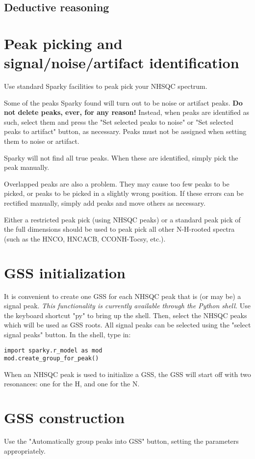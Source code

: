 \documentclass[11pt,a4paper]{article}
\begin{document}
\subsection{Deductive reasoning}


\section{Peak picking and signal/noise/artifact identification}
Use standard Sparky facilities to peak pick your NHSQC spectrum.

Some of the peaks Sparky found will turn out to be noise or artifact peaks.
\textbf{Do not delete peaks, ever, for any reason!}  Instead,
when peaks are identified as such, select them and press the "Set selected 
peaks to noise" or "Set selected peaks to artifact" button, as necessary.
Peaks must not be assigned when setting them to noise or artifact.

Sparky will not find all true peaks.  When these are identified, simply
pick the peak manually.

Overlapped peaks are also a problem.  They may cause too few peaks to be 
picked, or peaks to be picked in a slightly wrong position.  If these errors
can be rectified manually, simply add peaks and move others as necessary.

Either a restricted peak pick (using NHSQC peaks) or a standard peak pick
of the full dimensions should be used to peak pick all other N-H-rooted
spectra (such as the HNCO, HNCACB, CCONH-Tocsy, etc.).


\section{GSS initialization}
It is convenient to create one GSS for each NHSQC peak that is (or may be)
a signal peak.  \textit{This functionality is currently available through
the Python shell.}  Use the keyboard shortcut "py" to bring up the shell.
Then, select the NHSQC peaks which will be used as GSS roots.  
All signal peaks can be selected using the "select signal peaks" button.
In the shell, type in:
\begin{verbatim}
import sparky.r_model as mod
mod.create_group_for_peak()
\end{verbatim}

When an NHSQC peak is used to initialize a GSS, the GSS will start off
with two resonances: one for the H, and one for the N.


\section{GSS construction}
Use the "Automatically group peaks into GSS" button, setting the parameters
appropriately.
\end{document}
